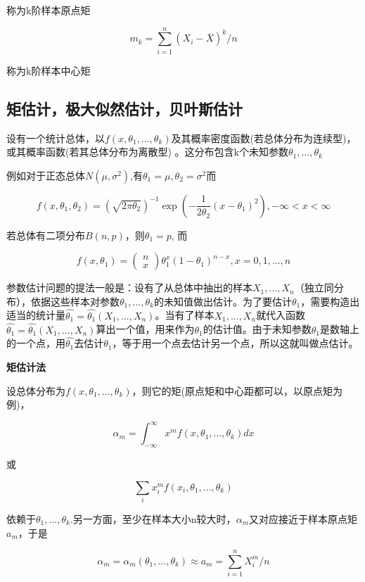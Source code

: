 \documentclass{ctexart}
\begin{document}
	称为k阶样本原点矩
	
	\[m_k=\sum_{i=1}^{n}(X_i-\overline{X})^k/n\]
	
	称为k阶样本中心矩
	
	\subsection{矩估计，极大似然估计，贝叶斯估计}

	设有一个统计总体，以\(f(x,\theta_1,...,\theta_k)\)及其概率密度函数(若总体分布为连续型)，或其概率函数(若其总体分布为离散型)	。这分布包含k个未知参数\(\theta_1,...,\theta_k\)
	
	例如对于正态总体\(N(\mu, \sigma^2)\),有\(\theta_1 = \mu, \theta_2=\sigma^2\)而
	
	\[f(x,\theta_1,\theta_2)=(\sqrt{2\pi\theta_2})^{-1}\exp(-\frac{1}{2\theta_2}(x-\theta_1)^2), -\infty < x < \infty\]
	
	若总体有二项分布\(B(n, p)\)，则\(\theta_1=p\), 而
	
	\[f(x,\theta_1)=
	\begin{pmatrix}
	n \\ x
	\end{pmatrix}
	\theta_1^x (1-\theta_1)^{n-x}, x=0,1,...,n\]
	
	参数估计问题的提法一般是：设有了从总体中抽出的样本\(X_1,...,X_n\)（独立同分布），依据这些样本对参数\(\theta_1,...,\theta_k\)的未知值做出估计。为了要估计\(\theta_1\)，需要构造出适当的统计量\(\hat{\theta_1}=\hat{\theta_1}(X_1,...,X_n)\)。当有了样本\(X_1,...,X_n\)就代入函数\(\hat{\theta_1}=\hat{\theta_1}(X_1,...,X_n)\)算出一个值，用来作为\(\theta_1\)的估计值。由于未知参数\(\theta_1\)是数轴上的一个点，用\(\hat{\theta_1}\)去估计\(\theta_1\)，等于用一个点去估计另一个点，所以这就叫做点估计。
	
	\mbox{}
	
	\textbf{矩估计法}
	
	设总体分布为\(f(x,\theta_1,...,\theta_k)\)，则它的矩(原点矩和中心距都可以，以原点矩为例)，
	
	\[\alpha_m=\int_{-\infty}^{\infty}x^mf(x,\theta_1,...,\theta_k)dx\]
	
	或
	
	\[\sum_{i}x_i^mf(x_i,\theta_1,...,\theta_k)\]
	
	依赖于\(\theta_1,...,\theta_k\).{\color{red}另一方面，至少在样本大小n较大时，\(\alpha_m\)又对应接近于样本原点矩\(a_m\)}，于是
	
	\[\alpha_m=\alpha_m(\theta_1,...,\theta_k)\approx a_m=\sum_{i=1}^{n}X_i^m/n\]
	
\end{document}
